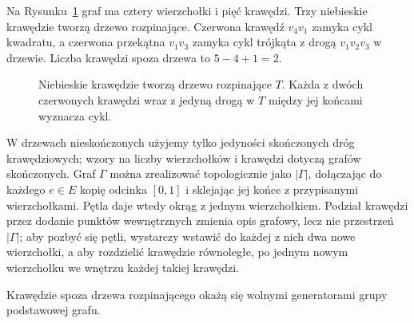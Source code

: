 \begin{przyklad}
Na Rysunku~\ref{fig:graf-drzewo-cykle} graf ma cztery
wierzchołki i pięć krawędzi. Trzy niebieskie krawędzie
tworzą drzewo rozpinające. Czerwona krawędź $v_4v_1$
zamyka cykl kwadratu, a czerwona przekątna $v_1v_3$
zamyka cykl trójkąta z drogą $v_1v_2v_3$ w drzewie.
Liczba krawędzi spoza drzewa to $5-4+1=2$.
\end{przyklad}

\begin{figure}[!htbp]
\centering
{}
\caption{Niebieskie krawędzie tworzą drzewo rozpinające $T$.
Każda z dwóch czerwonych krawędzi wraz z jedyną drogą
w $T$ między jej końcami wyznacza cykl.}
\label{fig:graf-drzewo-cykle}
\end{figure}

W drzewach nieskończonych użyjemy tylko jedyności
skończonych dróg krawędziowych; wzory na liczby
wierzchołków i krawędzi dotyczą grafów skończonych.
Graf $\Gamma$ można zrealizować topologicznie jako
$|\Gamma|$, dołączając do każdego $e\in E$ kopię
odcinka $[0,1]$ i sklejając jej końce z przypisanymi
wierzchołkami. Pętla daje wtedy okrąg z jednym
wierzchołkiem. Podział krawędzi przez dodanie punktów
wewnętrznych zmienia opis grafowy, lecz nie przestrzeń
$|\Gamma|$; aby pozbyć się pętli, wystarczy wstawić do
każdej z nich dwa nowe wierzchołki, a aby rozdzielić
krawędzie równoległe, po jednym nowym wierzchołku
we wnętrzu każdej takiej krawędzi.

Krawędzie spoza drzewa rozpinającego okażą się wolnymi
generatorami grupy podstawowej grafu.

